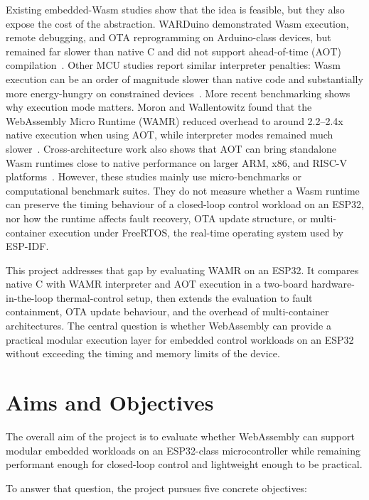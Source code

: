 \documentclass[12pt, a4paper]{report}
\begin{document}
Existing embedded-Wasm studies show that the idea is feasible, but they also expose the cost of the abstraction. WARDuino demonstrated Wasm execution, remote debugging, and OTA reprogramming on Arduino-class devices, but remained far slower than native C and did not support ahead-of-time (AOT) compilation~\cite{warduino2024}. Other MCU studies report similar interpreter penalties: Wasm execution can be an order of magnitude slower than native code and substantially more energy-hungry on constrained devices~\cite{wasm-iot-constrained}. More recent benchmarking shows why execution mode matters. Moron and Wallentowitz found that the WebAssembly Micro Runtime (WAMR) reduced overhead to around 2.2--2.4x native execution when using AOT, while interpreter modes remained much slower~\cite{moron2025benchmarking}. Cross-architecture work also shows that AOT can bring standalone Wasm runtimes close to native performance on larger ARM, x86, and RISC-V platforms~\cite{rausch2024cross}. However, these studies mainly use micro-benchmarks or computational benchmark suites. They do not measure whether a Wasm runtime can preserve the timing behaviour of a closed-loop control workload on an ESP32, nor how the runtime affects fault recovery, OTA update structure, or multi-container execution under FreeRTOS, the real-time operating system used by ESP-IDF.

This project addresses that gap by evaluating WAMR on an ESP32. It compares native C with WAMR interpreter and AOT execution in a two-board hardware-in-the-loop thermal-control setup, then extends the evaluation to fault containment, OTA update behaviour, and the overhead of multi-container architectures. The central question is whether WebAssembly can provide a practical modular execution layer for embedded control workloads on an ESP32 without exceeding the timing and memory limits of the device.

\section{Aims and Objectives}

The overall aim of the project is to evaluate whether WebAssembly can support modular embedded workloads on an ESP32-class microcontroller while remaining performant enough for closed-loop control and lightweight enough to be practical.

To answer that question, the project pursues five concrete objectives:
\end{document}
